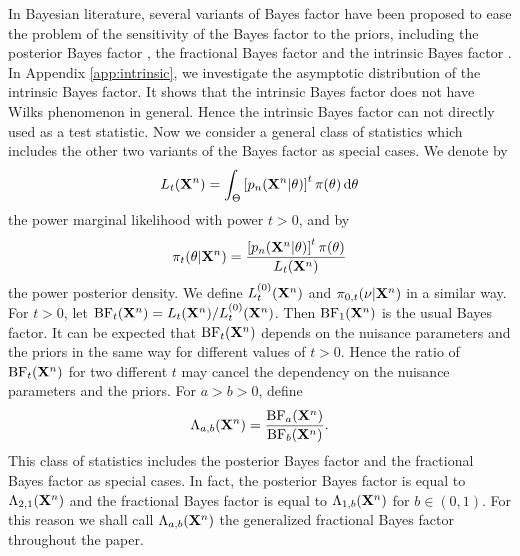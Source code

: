\documentclass[11pt]{article}
\theoremstyle{plain}
\theoremstyle{definition}
\theoremstyle{remark}
\begin{document}
In Bayesian literature, several variants of Bayes factor have been proposed to ease the problem of the sensitivity of the Bayes factor to the priors, including the posterior Bayes factor \cite{Aitkin1991Posterior}, the fractional Bayes factor \citep{Fractional1995} and the intrinsic Bayes factor \cite{intrinsicBayesFactor}.
In Appendix \ref{app:intrinsic}, we investigate the asymptotic distribution of the intrinsic Bayes factor.
It shows that the intrinsic Bayes factor does not have Wilks phenomenon in general.
Hence the intrinsic Bayes factor can not directly used as a test statistic.
Now we consider a general class of statistics which includes the other two variants of the Bayes factor as special cases.
We denote by
\begin{align*}
L_t(\mathbf{X}^{n})=\int_{\Theta}\left[p_n(\mathbf{X}^{n}|\theta)\right]^t \pi(\theta)\, \mathrm d\theta
\end{align*}
the power marginal likelihood with power $t>0$,
and by 
\begin{align*}
    \pi_t (\theta | \mathbf{X}^n) = \frac{\left[p_n(\mathbf{X}^{n}|\theta)\right]^t \pi(\theta)}{ L_t (\mathbf{X}^n) }
\end{align*}
the power posterior density.
We define $L_t^{(0)}(\mathbf{X}^{n})$ and $\pi_{0, t} (\nu | \mathbf{X}^n)$ in a similar way.
For $t > 0$, let $\text{BF}_t (\mathbf{X}^n) = L_t(\mathbf{X}^n)/ L_t^{(0)} (\mathbf{X}^n)$.
Then $\text{BF}_1(\mathbf{X}^n)$ is the usual Bayes factor.
It can be expected that $\text{BF}_t (\mathbf{X}^n)$ depends on the nuisance parameters and the priors in the same way for different values of $t>0$.
Hence the ratio of $\text{BF}_t (\mathbf{X}^n)$ for two different $t$ may cancel the dependency on the nuisance parameters and the priors.
For $a>b>0$, define
\begin{align*}
\Lambda_{a,b} (\mathbf{X}^n) =
\frac{\text{BF}_a (\mathbf{X}^n)}
{\text{BF}_b (\mathbf{X}^n)}
    .
\end{align*}
    This class of statistics includes the posterior Bayes factor and the fractional Bayes factor as special cases.
    In fact, the posterior Bayes factor is equal to $\Lambda_{2,1}(\mathbf{X}^n)$ and the fractional Bayes factor is equal to $\Lambda_{1,b}(\mathbf{X}^n)$ for $b\in (0,1)$.
    For this reason we shall call $\Lambda_{a,b} (\mathbf{X}^n)$ the generalized fractional Bayes factor throughout the paper.
\end{document}
